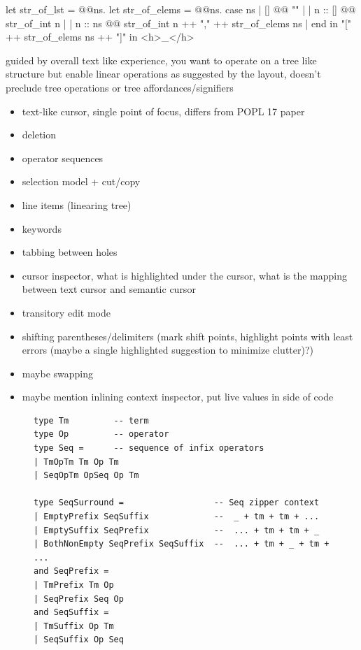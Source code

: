 \documentclass[runningheads]{llncs}
\begin{document}
\begin{hazel}
let str_of_lst =
	@\lam @ns.{
		let str_of_elems = 
			@\lam @ns.{
				case ns
				| []      @\casearrow @ ""                                     |
				| n :: [] @\casearrow @ str_of_int n                           |
				| n :: ns @\casearrow @ str_of_int n ++ "," ++ str_of_elems ns |
				end
			}
		in
		"[" ++ str_of_elems ns ++ "]"
	}
in
<h>_</h>
\end{hazel}

guided by overall text like experience, you want to operate on a tree like structure but enable linear operations as suggested by the layout, doesn't preclude tree operations or tree affordances/signifiers
\begin{itemize}
\item text-like cursor, single point of focus, differs from POPL 17 paper
\item deletion
\item operator sequences
\item selection model + cut/copy
\item line items (linearing tree)
\item keywords
\item tabbing between holes
\item cursor inspector, what is highlighted under the cursor, what is the mapping between text cursor and semantic cursor
\item transitory edit mode
\item shifting parentheses/delimiters (mark shift points, highlight points with least errors (maybe a single highlighted suggestion to minimize clutter)?)
\item maybe swapping
\item maybe mention inlining context inspector, put live values in side of code
\end{itemize}



\begin{figure}
\begin{lstlisting}
type Tm         -- term
type Op         -- operator
type Seq =      -- sequence of infix operators
| TmOpTm Tm Op Tm
| SeqOpTm OpSeq Op Tm
	
type SeqSurround =                  -- Seq zipper context
| EmptyPrefix SeqSuffix             --  _ + tm + tm + ...
| EmptySuffix SeqPrefix             --  ... + tm + tm + _
| BothNonEmpty SeqPrefix SeqSuffix  --  ... + tm + _ + tm + ...
and SeqPrefix =
| TmPrefix Tm Op
| SeqPrefix Seq Op
and SeqSuffix =
| TmSuffix Op Tm
| SeqSuffix Op Seq
\end{lstlisting}
\end{figure}
\end{document}
